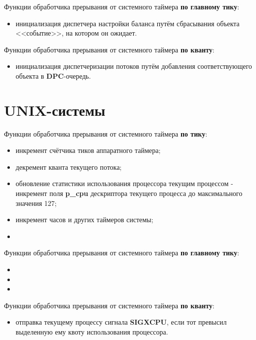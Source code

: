 \documentclass[a4paper,12pt]{extreport}
\begin{document}
Функции обработчика прерывания от системного таймера \textbf{по главному тику}:
\begin{itemize}
	\item инициализация диспетчера настройки баланса путём сбрасывания объекта <<событие>>, на котором он ожидает.
\end{itemize}

Функции обработчика прерывания от системного таймера \textbf{по кванту}:
\begin{itemize}
	\item инициализация диспетчеризации потоков путём добавления соответствующего объекта в \textbf{DPC}-очередь.
\end{itemize}


\section{UNIX-системы}

Функции обработчика прерывания от системного таймера \textbf{по тику}:
\begin{itemize}
	\item инкремент счётчика тиков аппаратного таймера;
	\item декремент кванта текущего потока;
	\item обновление статистики использования процессора текущим процессом - инкремент поля \textbf{p\_cpu} дескриптора текущего процесса до максимального значения 127;
	\item инкремент часов и других таймеров системы;
	\item 
\end{itemize}

Функции обработчика прерывания от системного таймера \textbf{по главному тику}:
\begin{itemize}
	\item 
	\item 
	\item 
\end{itemize}

Функции обработчика прерывания от системного таймера \textbf{по кванту}:
\begin{itemize}
	\item отправка текущему процессу сигнала \textbf{SIGXCPU}, если тот превысил выделенную ему квоту использования процессора.
\end{itemize}
\end{document}
